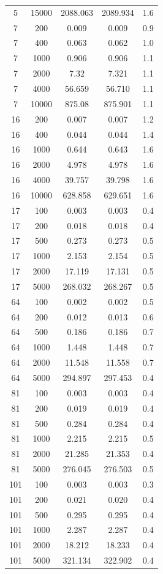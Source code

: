 \documentclass{deliverablereport}
\begin{document}
\begin{small}
\begin{center}
\begin{longtable}{|c|c|c|c|c|}
5&15000&2088.063&2089.934&1.6\\
7&200&0.009&0.009&0.9\\
7&400&0.063&0.062&1.0\\
7&1000&0.906&0.906&1.1\\
7&2000&7.32&7.321&1.1\\
7&4000&56.659&56.710&1.1\\
7&10000&875.08&875.901&1.1\\
16&200&0.007&0.007&1.2\\
16&400&0.044&0.044&1.4\\
16&1000&0.644&0.643&1.6\\
16&2000&4.978&4.978&1.6\\
16&4000&39.757&39.798&1.6\\
16&10000&628.858&629.651&1.6\\
17&100&0.003&0.003&0.4\\
17&200&0.018&0.018&0.4\\
17&500&0.273&0.273&0.5\\
17&1000&2.153&2.154&0.5\\
17&2000&17.119&17.131&0.5\\
17&5000&268.032&268.267&0.5\\
64&100&0.002&0.002&0.5\\
64&200&0.012&0.013&0.6\\
64&500&0.186&0.186&0.7\\
64&1000&1.448&1.448&0.7\\
64&2000&11.548&11.558&0.7\\
64&5000&294.897&297.453&0.4\\
81&100&0.003&0.003&0.4\\
81&200&0.019&0.019&0.4\\
81&500&0.284&0.284&0.4\\
81&1000&2.215&2.215&0.5\\
81&2000&21.285&21.353&0.4\\
81&5000&276.045&276.503&0.5\\
101&100&0.003&0.003&0.3\\
101&200&0.021&0.020&0.4\\
101&500&0.295&0.295&0.4\\
101&1000&2.287&2.287&0.4\\
101&2000&18.212&18.233&0.4\\
101&5000&321.134&322.902&0.4\\
  \end{longtable}
\end{center}


\end{small}
\end{document}
